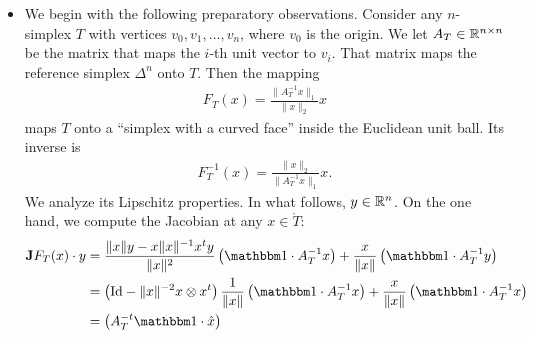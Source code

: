 \documentclass[10pt,a4paper]{article}
\newcommand{\todo}[1]{{\color{RedOrange}\textbf{#1}}}
\begin{document}
\begin{itemize}




        \item 
        We begin with the following preparatory observations. 
        Consider any $n$-simplex $T$ with vertices $v_0, v_1, \dots, v_n$, where $v_0$ is the origin. 
        We let $A_{T} \in {\mathbb R}^{n \times n}$ be the matrix that maps the $i$-th unit vector to $v_i$.
        That matrix maps the reference simplex $\Delta^{n}$ onto $T$. 
        Then the mapping 
        \begin{align}
            F_T(x) 
            = 
            \frac{ \| A_{T}^{-1} x \|_{1} }{ \|x\|_2 } x
        \end{align}
        maps $T$ onto a ``simplex with a curved face'' inside the Euclidean unit ball. Its inverse is
        \begin{align}
            F_T^{-1}(x) 
            = 
            \frac{ \|x\|_2 }{ \| A_{T}^{-1} x \|_{1} } x
            .
        \end{align}
        We analyze its Lipschitz properties.
        In what follows, $y \in {\mathbb R}^{n}$. 
        On the one hand, 
        we compute the Jacobian at any $x \in \mathring T$:
        \begin{align*}
            \Jacobian F_T(x) \cdot y
            &= 
            \frac{ \|x\| y - x \|x\|^{-1} x^t y }{\|x\|^2} 
            \left( \vecone \cdot A_{T}^{-1} x \right)
            + 
            \frac{x}{\|x\|} \left( \vecone \cdot A_{T}^{-1} y \right)
            \\&= 
            \left( \Id - \|x\|^{-2} x \otimes x^t \right)
            \frac{ 1 }{ \|x\| } 
            \left( \vecone \cdot A_{T}^{-1} x \right)
            + 
            \frac{x}{\|x\|} \left( \vecone \cdot A_{T}^{-1} x \right)
            \\&= 
            \left( A_{T}^{-t} \vecone \cdot \hat x \right)

\end{align*}
\end{itemize}
\end{document}
